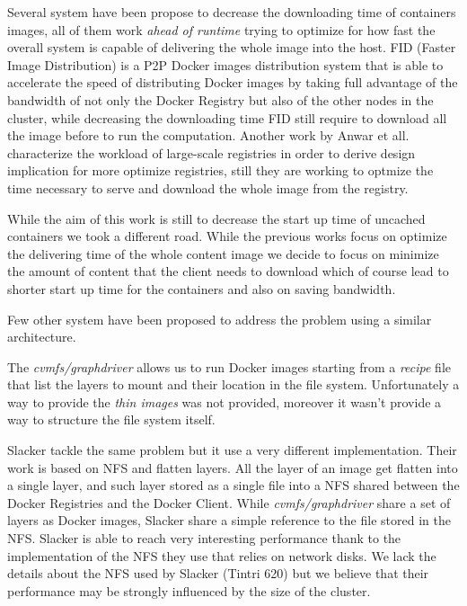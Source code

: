 Several system have been propose to decrease the downloading time of containers
images, all of them work \textit{ahead of runtime} trying to optimize
for how fast the overall system is capable of delivering the whole image into
the host. FID (Faster Image Distribution) \cite{FID} is a P2P Docker images
distribution system that is able to accelerate the speed of distributing Docker
images by taking full advantage of the bandwidth of not only the Docker
Registry but also of the other nodes in the cluster, while decreasing the
downloading time FID still require to download all the image before to run the
computation. Another work by Anwar et all. \cite{210500} characterize the
workload of large-scale registries in order to derive design implication for
more optimize registries, still they are working to optmize the time necessary
to serve and download the whole image from the registry.

While the aim of this work is still to decrease the start up time of uncached
containers we took a different road. While the previous works focus on optimize
the delivering time of the whole content image we decide to focus on minimize
the amount of content that the client needs to download which of course lead to
shorter start up time for the containers and also on saving bandwidth.

Few other system have been proposed to address the problem using a similar
architecture. 

The \textit{cvmfs/graphdriver} \cite{graphdriver-plugin} allows us to run
Docker images starting from a \textit{recipe} file that list the layers to
mount and their location in the file system. Unfortunately a way to provide the
\textit{thin images} was not provided, moreover it wasn't provide a way to
structure the file system itself. 

Slacker \cite{slacker} tackle the same problem but it use a very different
implementation. Their work is based on NFS and flatten layers. All the layer of
an image get flatten into a single layer, and such layer stored as a single
file into a NFS shared between the Docker Registries and the Docker Client.
While \textit{cvmfs/graphdriver} share a set of layers as Docker images,
Slacker share a simple reference to the file stored in the NFS. Slacker is able
to reach very interesting performance thank to the implementation of the NFS
they use that relies on network disks. We lack the details about the NFS used
by Slacker (Tintri 620) but we believe that their performance may be strongly
influenced by the size of the cluster.


